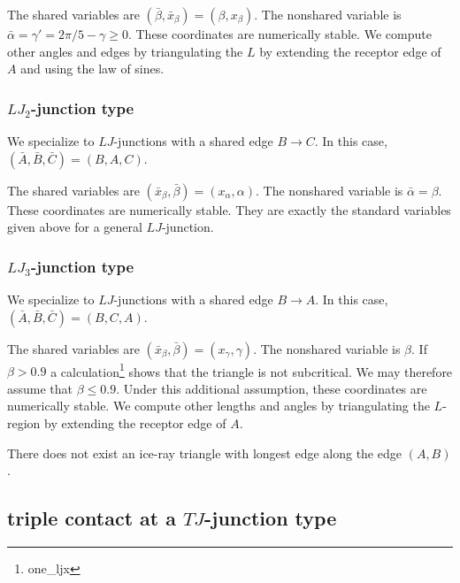 The shared variables are $(\bar \beta,\bar x_\beta)=(\beta,x_\beta)$.
The nonshared variable is $\bar\alpha=\gamma' = 2\pi/5-\gamma\ge0$.
These coordinates are numerically stable.  We compute other angles and
edges by triangulating the $L$ by extending the receptor edge of $A$
and using the law of sines.


\subsubsection{$LJ_2$-junction type}

We specialize to $LJ$-junctions with a shared edge $B\to C$.
In this case, $(\bar A,\bar B,\bar C)=(B,A,C)$.

The shared variables are $(\bar x_\beta,\bar\beta)=(x_\alpha,\alpha)$.
The nonshared variable is $\bar\alpha=\beta$.  These coordinates are
numerically stable.  They are exactly the standard variables given
above for a general $LJ$-junction.


\subsubsection{$LJ_3$-junction type}

We specialize to $LJ$-junctions with a shared edge $B\to A$.
In this case, $(\bar A,\bar B,\bar C)=(B,C,A)$.

The shared variables are $(\bar x_\beta,\bar\beta)=(x_\gamma,\gamma)$.
The nonshared variable is $\beta$.  If $\beta > 0.9$ a
calculation\footnote{one\_ljx} shows that the triangle is not
subcritical.  We may therefore assume that $\beta\le 0.9$.  Under this
additional assumption, these coordinates are numerically stable.  We
compute other lengths and angles by triangulating the $L$-region by
extending the receptor edge of $A$.

There does not exist an ice-ray triangle with longest edge along the
edge $(A,B)$.


\subsection{triple contact at a $TJ$-junction type}

